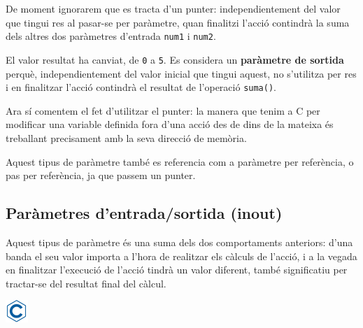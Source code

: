 \documentclass[]{book}
\begin{document}
De moment ignorarem que es tracta d'un punter: independientement del
valor que tingui res al pasar-se per paràmetre, quan finalitzi l'acció
contindrà la suma dels altres dos paràmetres d'entrada \texttt{num1} i
\texttt{num2}.

El valor resultat ha canviat, de \texttt{0} a \texttt{5}. Es considera
un \textbf{paràmetre de sortida} perquè, independientement del valor
inicial que tingui aquest, no s'utilitza per res i en finalitzar l'acció
contindrà el resultat de l'operació \texttt{suma()}.

Ara sí comentem el fet d'utilitzar el punter: la manera que tenim a C
per modificar una variable definida fora d'una acció des de dins de la
mateixa és treballant precisament amb la seva direcció de memòria.

Aquest tipus de paràmetre també es referencia com a paràmetre per
referència, o pas per referència, ja que passem un punter.

\subsection{Paràmetres d'entrada/sortida
(inout)}\label{parametres-dentradasortida-inout}

Aquest tipus de paràmetre és una suma dels dos comportaments anteriors:
d'una banda el seu valor importa a l'hora de realitzar els càlculs de
l'acció, i a la vegada en finalitzar l'execució de l'acció tindrà un
valor diferent, també significatiu per tractar-se del resultat final del
càlcul.

\includegraphics{./img/c.png}
\end{document}
